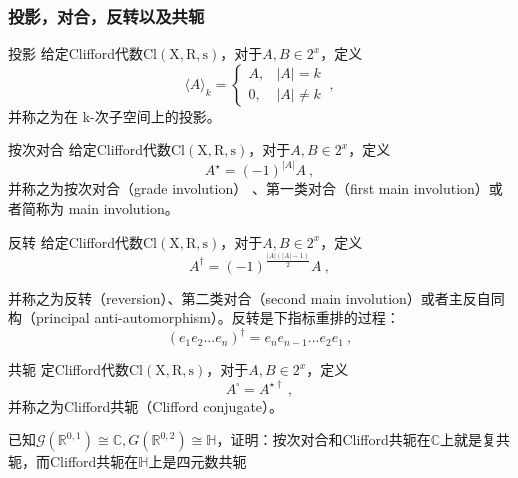\subsubsection{投影，对合，反转以及共轭}
\begin{definition}{投影}
给定Clifford代数$\mathrm {Cl(X,R,s)}$，对于$A,B\in 2^x$，定义
\begin{equation}
\langle A\rangle_k=\left\{\begin{array}{cc}
A, & |A|=k \\
0, & |A| \neq k
\end{array}\right.~,
\end{equation}
并称之为在 k-次子空间上的投影。
\end{definition}
\begin{definition}{按次对合}
给定Clifford代数$\mathrm {Cl(X,R,s)}$，对于$A,B\in 2^x$，定义
\begin{equation}
A^{\star}=(-1)^{|A|}A~,
\end{equation}
并称之为按次对合（grade involution） 、第一类对合（first main
involution）或者简称为 main involution。
\end{definition}
\begin{definition}{反转}
给定Clifford代数$\mathrm {Cl(X,R,s)}$，对于$A,B\in 2^x$，定义
\begin{equation}
A^{\dagger}=(-1)^{\frac{|A|(|A|-1)}{2}}A~,
\end{equation}
\end{definition}
并称之为反转（reversion）、第二类对合（second main involution）或者主反自同构（principal anti-automorphism）。反转是下指标重排的过程：
$$(e_1e_2...e_n)^{\dagger}=e_ne_{n-1}...e_2e_1~,$$
\begin{definition}{共轭}
定Clifford代数$\mathrm {Cl(X,R,s)}$，对于$A,B\in 2^x$，定义
\begin{equation}
A^{\square}=A^{\star \dagger}~,
\end{equation}
并称之为Clifford共轭（Clifford conjugate）。
\end{definition}
\begin{exercise}{}
已知$\mathcal G(\mathbb R^{0,1})\cong \mathbb C,G(\mathbb R^{0,2})\cong \mathbb H$，证明：按次对合和Clifford共轭在$\mathbb C$上就是复共轭，而Clifford共轭在$\mathbb H$上是四元数共轭
\end{exercise}
